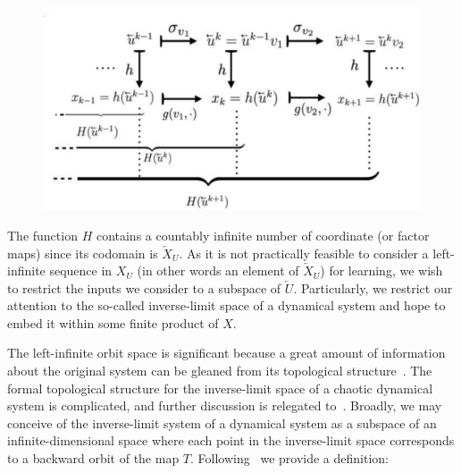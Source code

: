 \documentclass[a4paper,12pt,twoside]{report}
\begin{document}
\begin{figure}[ht]
  \includegraphics[scale=0.4]{_actionofh_H.eps}
  \centering
  \label{fig:actionh_H}
\end{figure}

The function $H$ contains a countably infinite number of coordinate (or factor maps) since its codomain is $\overleftarrow{X}_U$.  
As it is not practically feasible to consider a left-infinite sequence in $X_U$ (in other words an element of  $\overleftarrow{X}_U$) for learning, we wish to restrict the inputs we consider to a subspace of $\overleftarrow{U}$. 
Particularly, we restrict our attention to the  so-called inverse-limit space of a dynamical system and hope to embed it within some finite product of $X$. 


The left-infinite orbit space is significant because a great amount of information about the original system can be gleaned from its topological structure~\cite{ingram2011inverse,Manju_IEEE}. 
The formal topological structure for the inverse-limit space of a chaotic dynamical system is complicated, and further discussion is relegated to~\cite{kennedy2008inverse_limit, ingram2011inverse}.
Broadly, we may conceive of the inverse-limit system of a dynamical system as a subspace of an infinite-dimensional space where each point in the inverse-limit space corresponds to a backward orbit of the map $T$. 
Following~\cite{manjunath2021universal, ingram2011inverse} we provide a definition:
\end{document}

